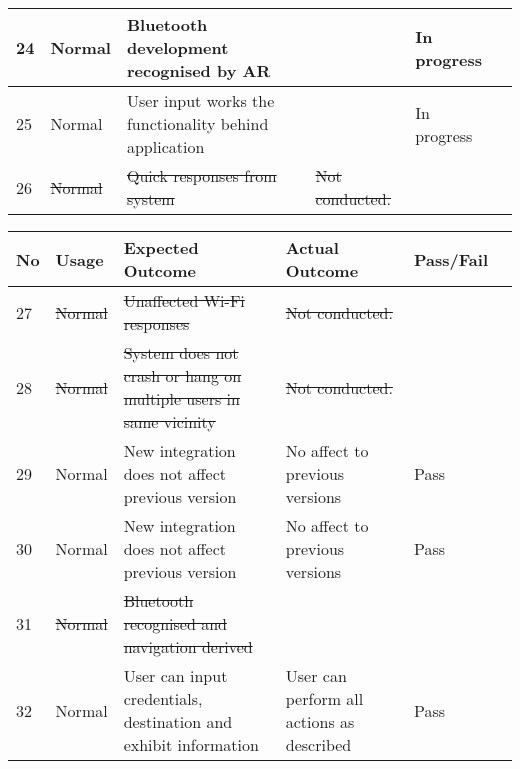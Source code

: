 \begin{turn}{-0}
\begin{tabular}{ | l | l | p{9cm} | p{10.5cm} | l | l |}
	24 & Normal & Bluetooth development recognised by AR & & \cellcolor{yellow}In progress\\ \hline
	
	25 & Normal & User input works the functionality behind application & & \cellcolor{yellow}In progress\\ \hline
	
	26 & \sout{Normal} & \sout{Quick responses from system} & \sout{Not conducted.} & \\ \hline
	
\end{tabular}
\end{turn}

\newpage
{}
\begin{turn}{-0}
\begin{tabular}{ | l | l | p{9cm} | p{10.5cm} | l | l |}
\hline
	\textbf{No} & \textbf{Usage} & \textbf{Expected Outcome} & \textbf{Actual Outcome} & \textbf{Pass/Fail}\\ \hline
	
	27 & \sout{Normal} & \sout{Unaffected Wi-Fi responses} & \sout{Not conducted.} & \\ \hline
	
	28 & \sout{Normal} & \sout{System does not crash or hang on multiple users in same vicinity} & \sout{Not conducted.} & \\ \hline
	
	29 & Normal & New integration does not affect previous version & No affect to previous versions & \cellcolor{green}Pass\\ \hline
	
	30 & Normal & New integration does not affect previous version & No affect to previous versions & \cellcolor{green}Pass\\ \hline
	
	31 & \sout{Normal} & \sout{Bluetooth recognised and navigation derived} & &\\ \hline
	
	32 & Normal & User can input credentials, destination and exhibit information & User can perform all actions as described & \cellcolor{green}Pass\\ \hline
	
	\end{tabular}
\end{turn}

